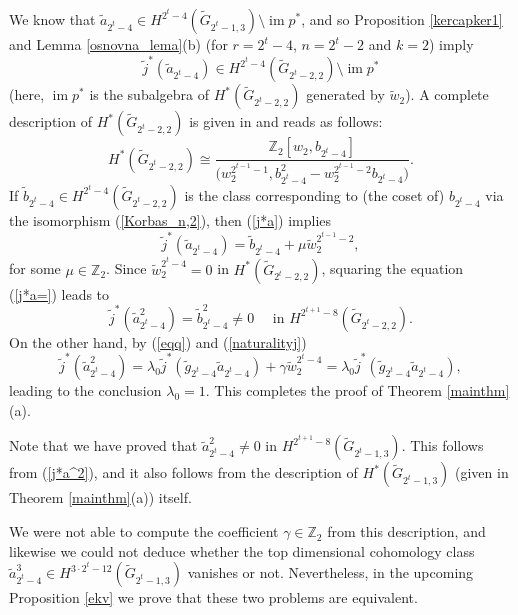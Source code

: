 \documentclass{amsart}
\newcommand{\im}{\operatorname{im}}
\theoremstyle{definition}
\theoremstyle{remark}
\numberwithin{equation}{section}
\begin{document}
We know that $\widetilde a_{2^t-4}\in H^{2^t-4}(\widetilde G_{2^t-1,3})\setminus\im p^*$, and so Proposition \ref{kercapker1} and Lemma \ref{osnovna_lema}(b) (for $r=2^t-4$, $n=2^t-2$ and $k=2$) imply 
\begin{equation}\label{j*a}
  \widetilde j^*(\widetilde a_{2^t-4})\in H^{2^t-4}(\widetilde G_{2^t-2,2})\setminus\im p^*  
\end{equation} 
(here, $\im p^*$ is the subalgebra of $H^*(\widetilde G_{2^t-2,2})$ generated by $\widetilde w_2$). A complete des\-cription of $H^*(\widetilde G_{2^t-2,2})$ is given in \cite[Theorem 2.1(b)]{KorbasRusin:Palermo} and reads as follows:
\begin{equation}\label{Korbas_n,2}
    H^*(\widetilde G_{2^t-2,2})\cong\frac{\mathbb Z_2[w_2,b_{2^t-4}]}{\big(w_2^{2^{t-1}-1},b_{2^t-4}^2 - w_2^{2^{t-1}-2}b_{2^t-4}\big)}.
    \end{equation}
If $\widetilde b_{2^t-4}\in H^{2^t-4}(\widetilde G_{2^t-2,2})$ is the class corresponding to (the coset of) $b_{2^t-4}$ via the isomorphism (\ref{Korbas_n,2}), then (\ref{j*a}) implies
\begin{equation}\label{j*a=}
 \widetilde j^*(\widetilde a_{2^t-4})=\widetilde b_{2^t-4}+\mu\widetilde w_2^{2^{t-1}-2},   
\end{equation}
for some $\mu\in\mathbb Z_2$. Since $\widetilde w_2^{2^t-4}=0$ in $H^*(\widetilde G_{2^t-2,2})$, squaring the equation (\ref{j*a=}) leads to
\begin{equation}\label{j*a^2}
 \widetilde j^*(\widetilde a_{2^t-4}^2)=\widetilde b_{2^t-4}^2\neq0 \quad \mbox{ in } H^{2^{t+1}-8}(\widetilde G_{2^t-2,2}). 
\end{equation}
On the other hand, by (\ref{eqq}) and (\ref{naturalityj})
\[\widetilde j^*(\widetilde a_{2^t-4}^2)=\lambda_0\widetilde j^*(\widetilde g_{2^t-4}\widetilde a_{2^t-4})+\gamma\widetilde w_2^{2^t-4}=\lambda_0\widetilde j^*(\widetilde g_{2^t-4}\widetilde a_{2^t-4}),\]
leading to the conclusion $\lambda_0=1$. This completes the proof of Theorem \ref{mainthm}(a).

\medskip

Note that we have proved that $\widetilde a_{2^t-4}^2\neq0$ in $H^{2^{t+1}-8}(\widetilde G_{2^t-1,3})$. This follows from (\ref{j*a^2}), and it also follows from the description of $H^*(\widetilde G_{2^t-1,3})$ (given in Theorem \ref{mainthm}(a)) itself.

We were not able to compute the coefficient $\gamma\in\mathbb Z_2$ from this description, and likewise we could not deduce whether the top dimensional cohomology class $\widetilde a_{2^t-4}^3\in H^{3\cdot2^t-12}(\widetilde G_{2^t-1,3})$ vanishes or not. Nevertheless, in the upcoming Proposition \ref{ekv} we prove that these two problems are equivalent.
\end{document}
